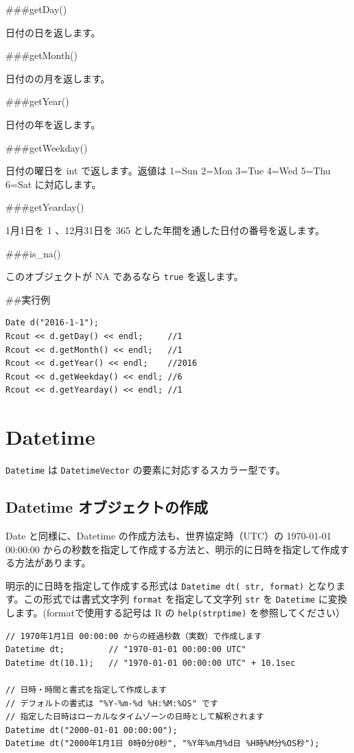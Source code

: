 \documentclass[]{book}
\begin{document}
\#\#\#getDay()

日付の日を返します。

\#\#\#getMonth()

日付のの月を返します。

\#\#\#getYear()

日付の年を返します。

\#\#\#getWeekday()

日付の曜日を int で返します。返値は 1=Sun 2=Mon 3=Tue 4=Wed 5=Thu 6=Sat に対応します。

\#\#\#getYearday()

1月1日を 1 、12月31日を 365 とした年間を通した日付の番号を返します。

\#\#\#is\_na()

このオブジェクトが NA であるなら \texttt{true} を返します。

\#\#実行例

\begin{verbatim}
Date d("2016-1-1");
Rcout << d.getDay() << endl;     //1
Rcout << d.getMonth() << endl;   //1
Rcout << d.getYear() << endl;    //2016
Rcout << d.getWeekday() << endl; //6
Rcout << d.getYearday() << endl; //1
\end{verbatim}

\hypertarget{datetime}{%
\chapter{Datetime}\label{datetime}}

\texttt{Datetime} は \texttt{DatetimeVector} の要素に対応するスカラー型です。

\hypertarget{datetime-}{%
\section{Datetime オブジェクトの作成}\label{datetime-}}

Date と同様に、Datetime の作成方法も、世界協定時（UTC）の 1970-01-01 00:00:00 からの秒数を指定して作成する方法と、明示的に日時を指定して作成する方法があります。

明示的に日時を指定して作成する形式は \texttt{Datetime\ dt(\ str,\ format)} となります。この形式では書式文字列 \texttt{format} を指定して文字列 \texttt{str} を \texttt{Datetime} に変換します。(formatで使用する記号は R の \texttt{help(strptime)} を参照してください）

\begin{verbatim}
// 1970年1月1日 00:00:00 からの経過秒数（実数）で作成します
Datetime dt;         // "1970-01-01 00:00:00 UTC"
Datetime dt(10.1);   // "1970-01-01 00:00:00 UTC" + 10.1sec

// 日時・時間と書式を指定して作成します
// デフォルトの書式は "%Y-%m-%d %H:%M:%OS" です
// 指定した日時はローカルなタイムゾーンの日時として解釈されます
Datetime dt("2000-01-01 00:00:00");
Datetime dt("2000年1月1日 0時0分0秒", "%Y年%m月%d日 %H時%M分%OS秒");
\end{verbatim}
\end{document}
